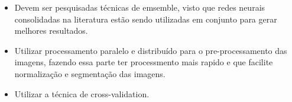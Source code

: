 \documentclass[openright]{UFRGS} %
\begin{document}
\begin{itemize}
 \item Devem ser pesquisadas técnicas de emsemble, visto que redes neurais consolidadas
na literatura estão sendo utilizadas em conjunto para gerar melhores resultados.

 \item Utilizar  processamento paralelo e distribuído para o pre-processamento das imagens, fazendo essa parte ter processmento mais
 rapido e que facilite normalização e segmentação das imagens.

\item Utilizar a técnica de cross-validation.

\end{itemize}









% 
\end{document}
